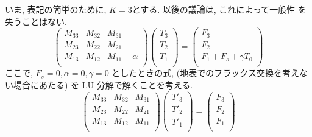 いま, 表記の簡単のために, $K=3$とする.  以後の議論は, これによって一般性
を失うことはない.
%
\begin{equation}
  \left( \begin{array}{lll} M_{33} & M_{32} & M_{31} \\ M_{23} &
  M_{22} & M_{21} \\ M_{13} & M_{12} & M_{11} + \alpha \\
\end{array} \right)
\left( \begin{array}{l} T_3 \\ T_2 \\ T_1 \\
\end{array} \right)
= \left( \begin{array}{l} F_3 \\ F_2 \\ F_1 + F_s + \gamma T_{0} \\
\end{array} \right)
\end{equation}
%
ここで,
$F_s = 0, \alpha=0, \gamma=0$ としたときの式,
(地表でのフラックス交換を考えない場合にあたる)
を LU 分解で解くことを考える.
%
\begin{equation}
  \left( \begin{array}{lll} M_{33} & M_{32} & M_{31} \\ M_{23} &
  M_{22} & M_{21} \\ M_{13} & M_{12} & M_{11} \\
         \end{array} \right)
  \left( \begin{array}{l}
         T'_3 \\ T'_2 \\ T'_1 \\
         \end{array} \right)
  = 
  \left(  \begin{array}{l}
          F_3 \\ F_2 \\ F_1 \\
          \end{array} \right)
  \label{solve-0}
\end{equation}

